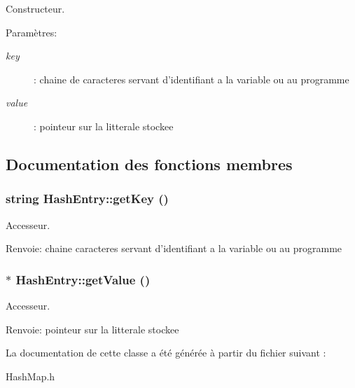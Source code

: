 Constructeur. 

\begin{Desc}
\item[Paramètres:]
\begin{description}
\item[{\em key}]: chaine de caracteres servant d'identifiant a la variable ou au programme \item[{\em value}]: pointeur sur la litterale stockee \end{description}
\end{Desc}


\subsection{Documentation des fonctions membres}
\hypertarget{class_hash_entry_040b7d2f3147a6944ad8d66301bdf80d}{
\subsubsection[{getKey}]{\setlength{\rightskip}{0pt plus 5cm}string HashEntry::getKey ()}}
\label{class_hash_entry_040b7d2f3147a6944ad8d66301bdf80d}


Accesseur. 

\begin{Desc}
\item[Renvoie:]chaine caracteres servant d'identifiant a la variable ou au programme \end{Desc}
\hypertarget{class_hash_entry_0edc1c3f8c73882a6d8a9fec88c45f6b}{
\subsubsection[{getValue}]{$\ast$ HashEntry::getValue ()}}
\label{class_hash_entry_0edc1c3f8c73882a6d8a9fec88c45f6b}


Accesseur. 

\begin{Desc}
\item[Renvoie:]pointeur sur la litterale stockee \end{Desc}


La documentation de cette classe a été générée à partir du fichier suivant :\begin{CompactItemize}
\item 
HashMap.h\end{CompactItemize}

